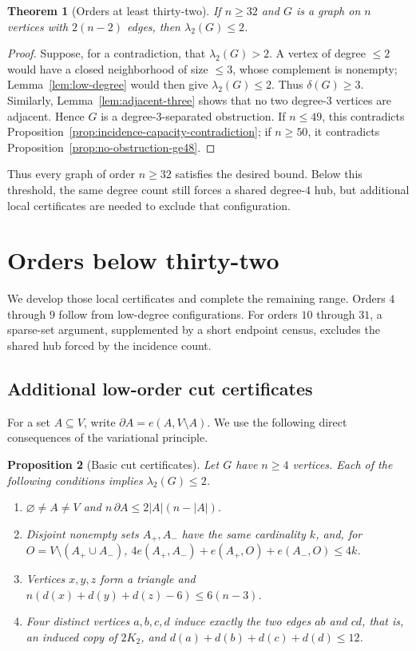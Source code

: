 \documentclass[11pt]{article}
\numberwithin{equation}{section}
\newtheorem{theorem}{Theorem}[section]
\newtheorem{proposition}[theorem]{Proposition}
\theoremstyle{definition}
\theoremstyle{remark}
\newcommand{\ac}{\lambda_2}
\begin{document}
\begin{theorem}[Orders at least thirty-two]\label{thm:range-ge32}
If \(n\ge32\) and \(G\) is a graph on \(n\) vertices with
\(2(n-2)\) edges, then \(\ac(G)\le2\).
\end{theorem}

\begin{proof}
Suppose, for a contradiction, that \(\ac(G)>2\).  A vertex of degree
\(\le2\) would have a closed neighborhood of size \(\le3\), whose complement
is nonempty; Lemma~\ref{lem:low-degree} would then give \(\ac(G)\le2\).
Thus \(\delta(G)\ge3\).  Similarly, Lemma~\ref{lem:adjacent-three} shows that
no two degree-\(3\) vertices are adjacent.  Hence \(G\) is a
degree-\(3\)-separated obstruction.  If \(n\le49\), this contradicts
Proposition~\ref{prop:incidence-capacity-contradiction}; if \(n\ge50\), it
    contradicts Proposition~\ref{prop:no-obstruction-ge48}.
\end{proof}

Thus every graph of order \(n\ge32\) satisfies the desired bound.  Below this
threshold, the same degree count still forces a shared degree-\(4\) hub, but
additional local certificates are needed to exclude that configuration.

\section{Orders below thirty-two}
\label{sec:orders-below-thirty-two}

We develop those local certificates and complete the remaining range.
Orders \(4\) through \(9\) follow from low-degree configurations.  For orders
\(10\) through \(31\), a sparse-set argument, supplemented by a short endpoint
census, excludes the shared hub forced by the incidence count.

\subsection{Additional low-order cut certificates}

For a set \(A\subseteq V\), write
\(\partial A=e(A,V\setminus A)\).  We use the following direct
consequences of the variational principle.

\begin{proposition}[Basic cut certificates]\label{lem:cut-certificates}
Let \(G\) have \(n\ge4\) vertices.  Each of the following conditions implies
\(\ac(G)\le2\).
\begin{enumerate}[label=\textup{(\roman*)}]
  \item \(\varnothing\ne A\ne V\) and
  \(n\,\partial A\le2|A|(n-|A|)\).
  \item Disjoint nonempty sets \(A_+,A_-\) have the same cardinality \(k\),
  and, for \(O=V\setminus(A_+\cup A_-)\),
  \(4e(A_+,A_-)+e(A_+,O)+e(A_-,O)\le4k\).
  \item Vertices \(x,y,z\) form a triangle and
  \(n(d(x)+d(y)+d(z)-6)\le6(n-3)\).
  \item Four distinct vertices \(a,b,c,d\) induce exactly the two edges
  \(ab\) and \(cd\), that is, an induced copy of \(2K_2\), and
  \(d(a)+d(b)+d(c)+d(d)\le12\).
\end{enumerate}
\end{proposition}
\end{document}
